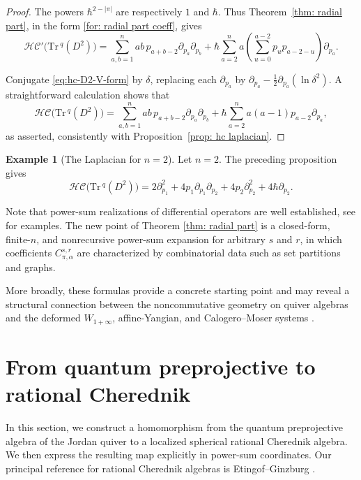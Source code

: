\documentclass[11pt,reqno]{amsart}
\theoremstyle{definition}
\newtheorem{example}[theorem]{Example}
\newcommand{\Tr}{\mathrm{Tr} \,}
\newcommand{\hc}{\mathcal{HC}}
\begin{document}
\begin{proof}
The powers \(\hbar^{2-|\pi|}\) are respectively \(1\) and
\(\hbar\). Thus Theorem~\ref{thm: radial part}, in the form
\eqref{for: radial part coeff}, gives
\begin{equation}\label{eq:hc-D2-V-form}
\hc'\bigl(\Tr^q(D^2)\bigr)
=\sum_{a,b=1}^n ab\,p_{a+b-2}\partial_{p_a}\partial_{p_b}
+\hbar\sum_{a=2}^n a
\left(\sum_{u=0}^{a-2}p_u p_{a-2-u}\right)\partial_{p_a}.
\end{equation}

Conjugate \eqref{eq:hc-D2-V-form} by \(\delta\), replacing each
\(\partial_{p_a}\) by
\(\partial_{p_a}-\frac12\partial_{p_a}(\ln\delta^2)\).
A straightforward calculation shows that
\[
\hc\bigl(\Tr^q(D^2)\bigr)
=\sum_{a,b=1}^n ab\,p_{a+b-2}\partial_{p_a}\partial_{p_b}
+\hbar\sum_{a=2}^n a(a-1)p_{a-2}\partial_{p_a},
\]
as asserted, consistently with Proposition~\ref{prop: hc laplacian}.
\end{proof}




\begin{example}[The Laplacian for \(n=2\)]
Let \(n=2\).
The preceding proposition gives
\[
\hc\bigl(\Tr^q(D^2)\bigr)
=
2\partial_{p_1}^2
+4p_1\partial_{p_1}\partial_{p_2}
+4p_2\partial_{p_2}^2
+4\hbar\partial_{p_2}.
\]
\end{example}


Note that power-sum realizations of differential operators are
well established,
see \cite{SerVes2015,Dra2024Gen} for examples.
The new point of Theorem \ref{thm: radial part} is a closed-form,
finite-\(n\), and nonrecursive power-sum expansion for arbitrary \(s\) and \(r\), in which coefficients \(C_{\pi,\alpha}^{s,r}\) are
characterized by combinatorial data such as set partitions and graphs.

More broadly,
these formulas provide a concrete starting point and may reveal a structural connection between the noncommutative geometry on quiver algebras
and the deformed \(W_{1+\infty}\), affine-Yangian, and
Calogero--Moser systems \cite{ArbSch2013,KN2016Qua,SchVas2013,DesHal2012}.

\section{From quantum preprojective to rational Cherednik}\label{sec: comparison}

In this section, we construct a homomorphism from the quantum preprojective algebra of the Jordan quiver to a localized spherical rational Cherednik algebra.
 We then express the resulting map explicitly in power-sum coordinates. Our principal reference for rational Cherednik algebras is Etingof--Ginzburg \cite{EG2002}.
\end{document}
